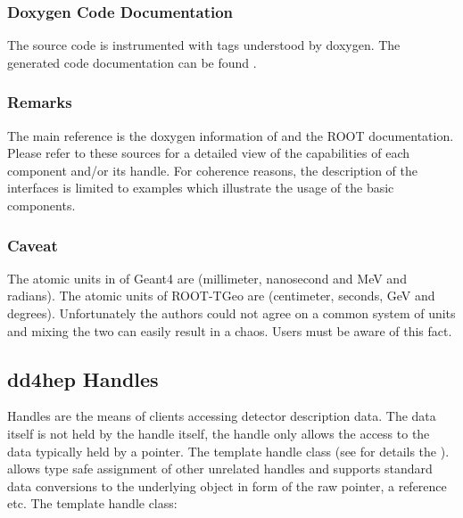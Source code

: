\documentclass[10pt,a4paper]{article}
\begin{document}
\subsubsection{Doxygen Code Documentation}
\label{sec:dd4hep-user-manual-doxygen}
\noindent
The \DDhep source code is instrumented with tags understood by doxygen.
The generated code documentation can be found
.

\subsubsection{Remarks}
\label{sec:dd4hep-user-manual-remarks}
\noindent
The main reference is the doxygen information of \DDhep and the ROOT documentation. 
Please refer to these sources for a detailed view of the capabilities of 
each component and/or its handle.
For coherence reasons, the description of the
interfaces is limited to examples which illustrate the usage of the basic 
components. 

\subsubsection{Caveat}
\label{sec:dd4hep-user-manual-caveat}
\noindent
The atomic units in of Geant4 are (millimeter, nanosecond and MeV and radians).
The atomic units of ROOT-TGeo are (centimeter, seconds, GeV and degrees).
Unfortunately the authors could not agree on a common system of units
and mixing the two can easily result in a chaos.
Users must be aware of this fact.


\newpage
\subsection{dd4hep Handles}
\label{sec:dd4hep-user-manual-handles}
\noindent
Handles are the means of clients accessing \DDhep detector description data.
The data itself is not held by the handle itself, the handle only allows the
access to the data typically held by a pointer. The template handle class
(see for details the ).
allows type safe assignment of other unrelated handles and supports standard 
data conversions to the underlying object in form of the raw pointer, 
a reference etc. The template handle class:
\end{document}
